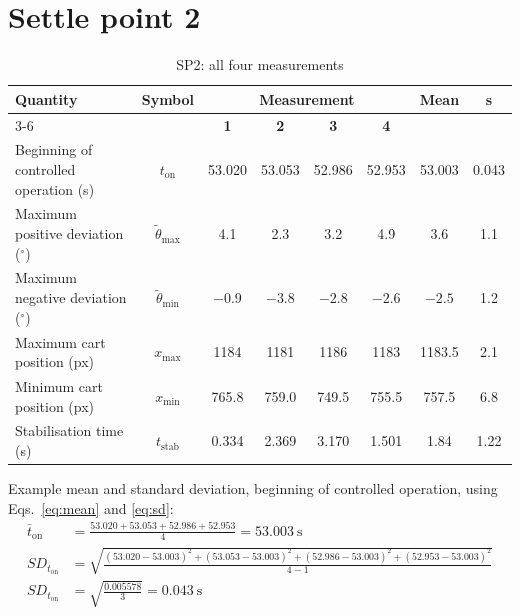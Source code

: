 \documentclass[11pt,a4paper]{article}
\begin{document}
\section{Settle point 2}
\begin{table}[H]
    \centering
    \caption{SP2: all four measurements}
    \label{tab:sp2_all}
    \renewcommand{\arraystretch}{1.6}
    \begin{tabular}{|l|c|c|c|c|c|c|c|}
        \hline
        \textbf{Quantity} & \textbf{Symbol} & \multicolumn{4}{c|}{\textbf{Measurement}} & \textbf{Mean} & \textbf{s} \\
        \cline{3-6}
         & & \textbf{1} & \textbf{2} & \textbf{3} & \textbf{4} & & \\
        \hline
        Beginning of controlled operation (s) & $t_\text{on}$               & 53.020 & 53.053 & 52.986 & 52.953 & 53.003 & 0.043 \\ \hline
        Maximum positive deviation ($^\circ$) & $\tilde{\theta}_\text{max}$ & 4.1    & 2.3    & 3.2    & 4.9    & 3.6    & 1.1   \\ \hline
        Maximum negative deviation ($^\circ$) & $\tilde{\theta}_\text{min}$ & $-0.9$ & $-3.8$ & $-2.8$ & $-2.6$ & $-2.5$ & 1.2   \\ \hline
        Maximum cart position (px)            & $x_\text{max}$              & 1184   & 1181   & 1186   & 1183   & 1183.5 & 2.1   \\ \hline
        Minimum cart position (px)            & $x_\text{min}$              & 765.8  & 759.0  & 749.5  & 755.5  & 757.5  & 6.8   \\ \hline
        Stabilisation time (s)                & $t_\text{stab}$             & 0.334  & 2.369  & 3.170  & 1.501  & 1.84   & 1.22  \\ \hline
    \end{tabular}
\end{table}

Example mean and standard deviation, beginning of controlled operation, using Eqs.~\eqref{eq:mean} and \eqref{eq:sd}:
\begin{align*}
\bar{t}_\text{on} &= \frac{53.020 + 53.053 + 52.986 + 52.953}{4} = 53.003~\text{s} \\
SD_{t_\text{on}} &= \sqrt{\frac{(53.020-53.003)^2 + (53.053-53.003)^2 + (52.986-53.003)^2 + (52.953-53.003)^2}{4-1}} \\
SD_{t_\text{on}} &= \sqrt{\frac{0.005578}{3}} = 0.043~\text{s}
\end{align*}
\end{document}
